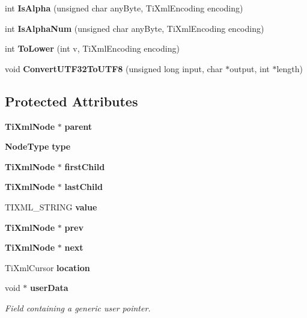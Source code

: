 \begin{CompactItemize}
\item 
int {\bf Is\-Alpha} (unsigned char any\-Byte, Ti\-Xml\-Encoding encoding)\label{classTiXmlBase_TiXmlUnknownf11}

\item 
int {\bf Is\-Alpha\-Num} (unsigned char any\-Byte, Ti\-Xml\-Encoding encoding)\label{classTiXmlBase_TiXmlUnknownf12}

\item 
int {\bf To\-Lower} (int v, Ti\-Xml\-Encoding encoding)\label{classTiXmlBase_TiXmlUnknownf13}

\item 
void {\bf Convert\-UTF32To\-UTF8} (unsigned long input, char $\ast$output, int $\ast$length)\label{classTiXmlBase_TiXmlUnknownf14}

\end{CompactItemize}
\subsection*{Protected Attributes}
\begin{CompactItemize}
\item 
{\bf Ti\-Xml\-Node} $\ast$ {\bf parent}\label{classTiXmlNode_TiXmlUnknownp0}

\item 
{\bf Node\-Type} {\bf type}\label{classTiXmlNode_TiXmlUnknownp1}

\item 
{\bf Ti\-Xml\-Node} $\ast$ {\bf first\-Child}\label{classTiXmlNode_TiXmlUnknownp2}

\item 
{\bf Ti\-Xml\-Node} $\ast$ {\bf last\-Child}\label{classTiXmlNode_TiXmlUnknownp3}

\item 
TIXML\_\-STRING {\bf value}\label{classTiXmlNode_TiXmlUnknownp4}

\item 
{\bf Ti\-Xml\-Node} $\ast$ {\bf prev}\label{classTiXmlNode_TiXmlUnknownp5}

\item 
{\bf Ti\-Xml\-Node} $\ast$ {\bf next}\label{classTiXmlNode_TiXmlUnknownp6}

\item 
Ti\-Xml\-Cursor {\bf location}\label{classTiXmlBase_TiXmlUnknownp7}

\item 
void $\ast$ {\bf user\-Data}\label{classTiXmlBase_TiXmlUnknownp8}

\begin{CompactList}\small\item\em Field containing a generic user pointer. \item\end{CompactList}\end{CompactItemize}
